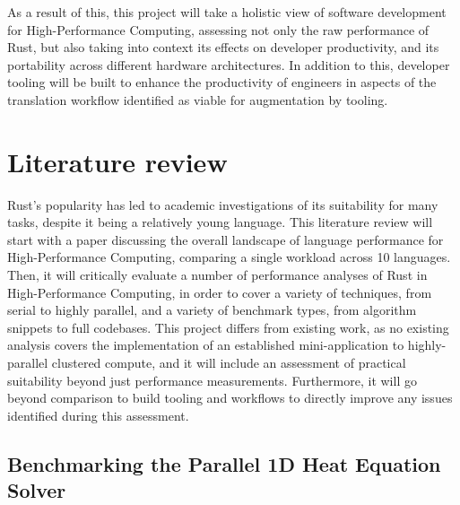 As a result of this, this project will take a holistic view of software development for High-Performance Computing, assessing not only the raw performance of Rust, but also taking into context its effects on developer productivity, and its portability across different hardware architectures. In addition to this, developer tooling will be built to enhance the productivity of engineers in aspects of the translation workflow identified as viable for augmentation by tooling.


\section{Literature review} %
\label{sec:literature-review}

Rust's popularity has led to academic investigations of its suitability for many tasks, despite it being a relatively young language. This literature review will start with a paper discussing the overall landscape of language performance for High-Performance Computing, comparing a single workload across 10 languages. Then, it will critically evaluate a number of performance analyses of Rust in High-Performance Computing, in order to cover a variety of techniques, from serial to highly parallel, and a variety of benchmark types, from algorithm snippets to full codebases. This project differs from existing work, as no existing analysis covers the implementation of an established mini-application to highly-parallel clustered compute, and it will include an assessment of practical suitability beyond just performance measurements. Furthermore, it will go beyond comparison to build tooling and workflows to directly improve any issues identified during this assessment.

\subsection{Benchmarking the Parallel 1D Heat Equation Solver}
\label{ssec:diehl-et-al}

